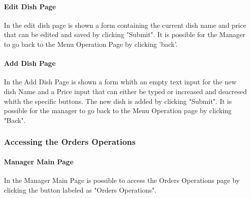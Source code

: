 \paragraph{Edit Dish Page}
In the edit dish page is shown a form containing the current dish name and price that can be edited and saved by clicking "Submit".
It is possible for the Manager to go back to the Menu Operation Page by clicking 'back'.

\paragraph{Add Dish Page}
In the Add Dish Page is shown a form whith an empty text input for the new dish Name and a Price input that can either be typed or increased and deacresed whith the specific buttons. The new dish is added by clicking "Submit".
It is possible for the manager to go back to the Menu Operation page by clicking "Back".

\subsubsection{Accessing the Orders Operations}
\paragraph{Manager Main Page}
In the Manager Main Page is possible to access the Orders Operations page by clicking the button labeled as "Orders Operations".
